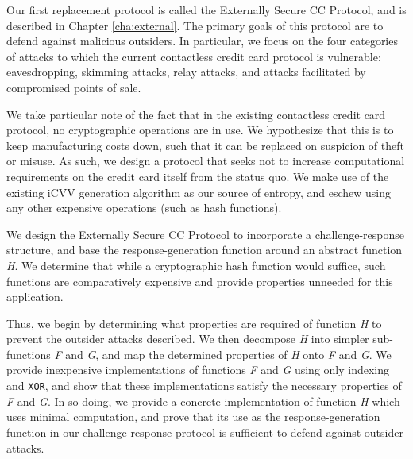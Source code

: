 


Our first replacement protocol is called the Externally Secure CC Protocol, and is described in Chapter \ref{cha:external}.
The primary goals of this protocol are to defend against malicious outsiders.
In particular, we focus on the four categories of attacks to which the current contactless credit card protocol is vulnerable:
    eavesdropping, skimming attacks, relay attacks, and attacks facilitated by compromised points of sale.

We take particular note of the fact that in the existing contactless credit card protocol, no cryptographic operations are in use.
We hypothesize that this is to keep manufacturing costs down, such that it can be replaced on suspicion of theft or misuse.
As such, we design a protocol that seeks not to increase computational requirements on the credit card itself from the status quo.
We make use of the existing iCVV generation algorithm as our source of entropy, and eschew using any other expensive operations (such as hash functions).

We design the Externally Secure CC Protocol to incorporate a challenge-response structure,
    and base the response-generation function around an abstract function \emph{H}.
We determine that while a cryptographic hash function would suffice, such functions are comparatively expensive and provide properties unneeded for this application.

Thus, we begin by determining what properties are required of function \emph{H} to prevent the outsider attacks described.
We then decompose \emph{H} into simpler sub-functions \emph{F} and \emph{G}, and map the determined properties of \emph{H} onto \emph{F} and \emph{G}.
We provide inexpensive implementations of functions \emph{F} and \emph{G} using only indexing and \texttt{XOR},
    and show that these implementations satisfy the necessary properties of \emph{F} and \emph{G}.
In so doing, we provide a concrete implementation of function \emph{H} which uses minimal computation,
    and prove that its use as the response-generation function in our challenge-response protocol is sufficient to defend against outsider attacks.

